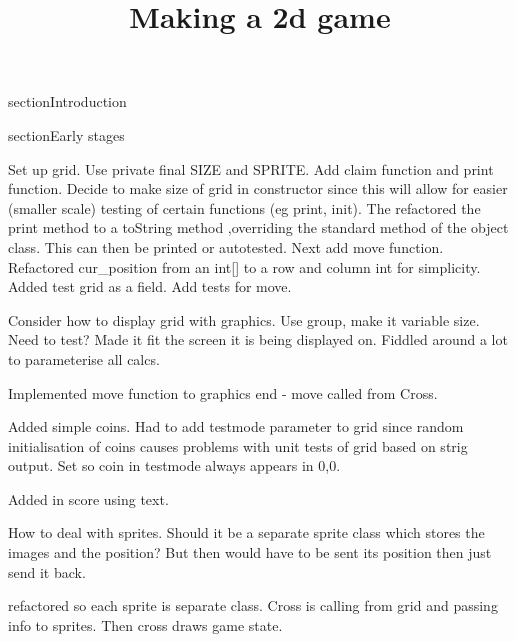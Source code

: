 \documentclass{article}
\begin{document}
\title{Making a 2d game}
\maketitle

section{Introduction}

section{Early stages}

Set up grid. Use private final SIZE and SPRITE. Add claim function and print function. Decide to make size of grid
in constructor since this will allow for easier (smaller scale) testing of certain functions (eg print, init).
The refactored the print method to a toString method ,overriding the standard method of the object class. This
can then be printed or autotested. Next add move function. Refactored cur_position from an int[] to a row and
column int for simplicity. Added test grid as a field. Add tests for move.

Consider how to display grid with graphics. Use group, make it variable size. Need to test? Made it fit the screen
it is being displayed on. Fiddled around a lot to parameterise all calcs.

Implemented move function to graphics end - move called from Cross.

Added simple coins. Had to add testmode parameter to grid since random initialisation of coins causes problems with
unit tests of grid based on strig output. Set so coin in testmode always appears in 0,0.

Added in score using text.

How to deal with sprites. Should it be a separate sprite class which stores the images and the position? But then
would have to be sent its position then just send it back.

refactored so each sprite is separate class. Cross is calling from grid and passing info to sprites. Then cross draws
game state.
\end{document}
